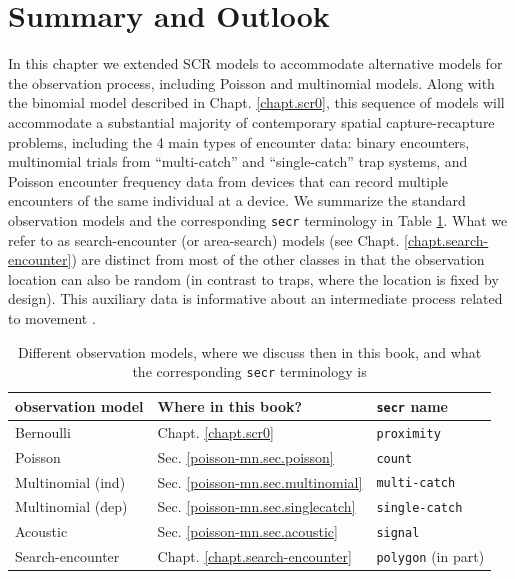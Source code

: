 \section{Summary and Outlook}

In this chapter we extended SCR models to accommodate alternative
 models for the observation process, including Poisson and multinomial models.  Along
with the binomial model described in Chapt. \ref{chapt.scr0}, this
sequence of models will accommodate a substantial majority of
contemporary spatial capture-recapture problems, including
the 4 main types of encounter data:
binary encounters, multinomial trials from ``multi-catch'' and
``single-catch'' \citep{efford:2004, efford:2011, royle_gardner:2011}
trap systems, and Poisson encounter frequency data from devices that can
record multiple encounters of the same individual at a device.  We
summarize the standard observation models and the corresponding
\mbox{\tt secr} terminology in Table \ref{poisson-mn.tab.models}.  What
we refer to as search-encounter (or area-search) models (see
Chapt. \ref{chapt.search-encounter}) are distinct
from most of the other classes in that the observation location can
also be random (in contrast to traps, where the location is fixed by
design). This auxiliary data is informative about an intermediate
process related to movement \citep{royle_young:2008}.

\begin{table}[ht]
\centering
\caption{
Different observation models, where we discuss then in this
  book, and what the corresponding \mbox{\tt secr} terminology is
}
\begin{tabular}{lll}
\hline \hline
observation model & Where in this book?  &  \mbox{\tt secr} name  \\ \hline
Bernoulli         & Chapt. \ref{chapt.scr0}    &   \mbox{\tt proximity} \\
Poisson           & Sec. \ref{poisson-mn.sec.poisson} & \mbox{\tt count} \\
Multinomial (ind) & Sec. \ref{poisson-mn.sec.multinomial} & \mbox{\tt  multi-catch} \\
Multinomial (dep) & Sec. \ref{poisson-mn.sec.singlecatch} & \mbox{\tt  single-catch} \\
Acoustic          & Sec. \ref{poisson-mn.sec.acoustic}
   &  \mbox{\tt signal}  \\
Search-encounter      & Chapt. \ref{chapt.search-encounter}  &
\mbox{\tt polygon} (in part) \\ \hline
\end{tabular}
\label{poisson-mn.tab.models}
\end{table}

